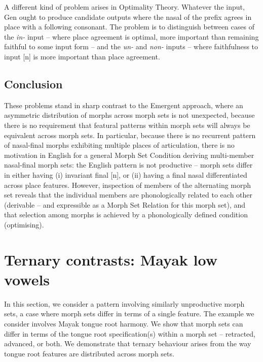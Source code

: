 A different kind of problem arises in Optimality Theory. Whatever the input, Gen ought to produce candidate outputs where the nasal of the prefix agrees in place with a following consonant. The problem is to distinguish between cases of the \textit{in-} input -- where place agreement is optimal, more important than remaining faithful to some input form -- and the \textit{un-} and \textit{non-} inputs -- where faithfulness to input [n] is more important than place agreement.
\subsection{Conclusion}
These problems stand in sharp contrast to the Emergent approach, where an asymmetric distribution of morphs across morph sets is not unexpected, because there is no requirement that featural patterns within morph sets will always be equivalent across morph sets. In particular, because there is no recurrent pattern of nasal-final morphs exhibiting multiple places of articulation, there is no motivation in English for a general Morph Set Condition deriving multi-member nasal-final morph sets: the English pattern is not productive -- morph sets differ in  either having (i) invariant final [n], or (ii) having a final nasal differentiated across place features. However, inspection of members of the alternating morph set reveals that the individual members are phonologically related to each other (derivable -- and expressible as a Morph Set Relation for this morph set), and that selection among morphs is achieved by a phonologically defined condition (optimising). 



\section{Ternary contrasts: Mayak low vowels} \label{section_Mayak_low_vowels}

In this section, we consider a pattern involving similarly unproductive morph sets, a case where morph sets differ in terms of a single feature. The example we consider involves Mayak tongue root harmony. We show that morph sets can differ  in terms of  the tongue root specification(s) within a morph set -- retracted, advanced, or both. We demonstrate that ternary behaviour arises from the way tongue root features are distributed across morph sets.


